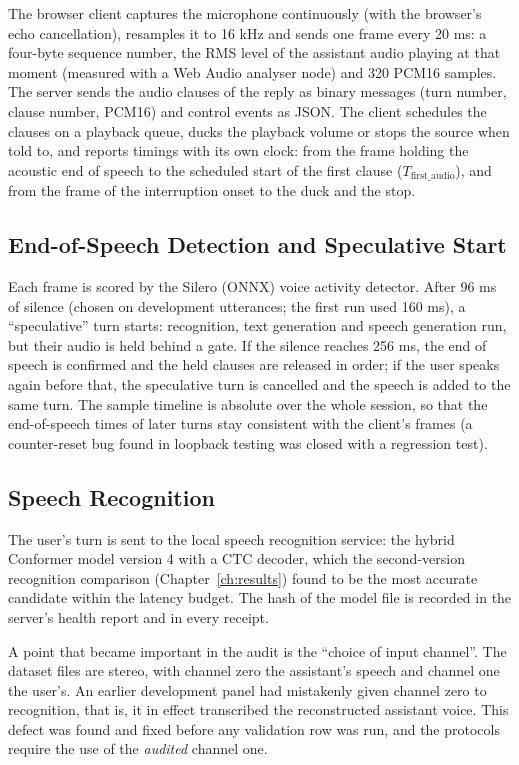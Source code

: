 The browser client captures the microphone continuously (with the browser's echo
cancellation), resamples it to 16 kHz and sends one frame every 20 ms: a four-byte
sequence number, the RMS level of the assistant audio playing at that moment (measured
with a Web Audio analyser node) and 320 PCM16 samples. The server sends the audio
clauses of the reply as binary messages (turn number, clause number, PCM16) and control
events as JSON. The client schedules the clauses on a playback queue, ducks the
playback volume or stops the source when told to, and reports timings with its own
clock: from the frame holding the acoustic end of speech to the scheduled start of the
first clause ($T_{\text{first\_audio}}$), and from the frame of the interruption onset to
the duck and the stop.

\subsection{End-of-Speech Detection and Speculative Start}

Each frame is scored by the Silero (ONNX) voice activity detector. After 96 ms of
silence (chosen on development utterances; the first run used 160 ms), a
``speculative'' turn starts: recognition, text generation and speech generation run,
but their audio is held behind a gate. If the silence reaches 256 ms, the end of speech
is confirmed and the held clauses are released in order; if the user speaks again
before that, the speculative turn is cancelled and the speech is added to the same
turn. The sample timeline is absolute over the whole session, so that the end-of-speech
times of later turns stay consistent with the client's frames (a counter-reset bug found
in loopback testing was closed with a regression test).

\subsection{Speech Recognition}

The user's turn is sent to the local speech recognition service: the hybrid Conformer
model version 4 with a CTC decoder, which the second-version recognition comparison
(Chapter~\ref{ch:results}) found to be the most accurate candidate within the latency
budget. The hash of the model file is recorded in the server's health report and in
every receipt.

A point that became important in the audit is the ``choice of input channel''. The
dataset files are stereo, with channel zero the assistant's speech and channel one the
user's. An earlier development panel had mistakenly given channel zero to recognition,
that is, it in effect transcribed the reconstructed assistant voice. This defect was
found and fixed before any validation row was run, and the protocols require the use of
the \emph{audited} channel one.

